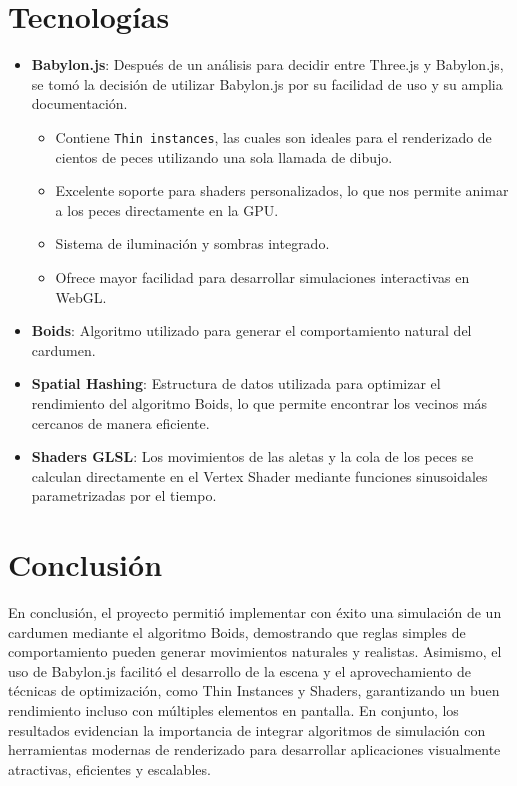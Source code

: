 \documentclass[acmtog]{acmart}
\begin{document}
\section*{Tecnologías}

\begin{itemize}
    \item \textbf{Babylon.js}: Después de un análisis para decidir entre Three.js y Babylon.js, se tomó la decisión de utilizar Babylon.js por su facilidad de uso y su amplia documentación.
    \begin{itemize}
        \item Contiene \texttt{Thin instances}, las cuales son ideales para el renderizado de cientos de peces utilizando una sola llamada de dibujo.
        \item Excelente soporte para shaders personalizados, lo que nos permite animar a los peces directamente en la GPU.
        \item Sistema de iluminación y sombras integrado.
        \item Ofrece mayor facilidad para desarrollar simulaciones interactivas en WebGL.
    \end{itemize}
    \item \textbf{Boids}: Algoritmo utilizado para generar el comportamiento natural del cardumen.
    \item \textbf{Spatial Hashing}: Estructura de datos utilizada para optimizar el rendimiento del algoritmo Boids, lo que permite encontrar los vecinos más cercanos de manera eficiente.
    \item \textbf{Shaders GLSL}: Los movimientos de las aletas y la cola de los peces se calculan directamente en el Vertex Shader mediante funciones sinusoidales parametrizadas por el tiempo.
\end{itemize}

\section*{Conclusión}

En conclusión, el proyecto permitió implementar con éxito una simulación de un cardumen mediante el algoritmo Boids, demostrando que reglas simples de comportamiento pueden generar movimientos naturales y realistas. Asimismo, el uso de Babylon.js facilitó el desarrollo de la escena y el aprovechamiento de técnicas de optimización, como Thin Instances y Shaders, garantizando un buen rendimiento incluso con múltiples elementos en pantalla. En conjunto, los resultados evidencian la importancia de integrar algoritmos de simulación con herramientas modernas de renderizado para desarrollar aplicaciones visualmente atractivas, eficientes y escalables.
\end{document}

